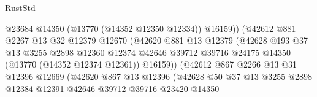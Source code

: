 \begin{lexlean}{RustStd}
\begin{coremodule}
                                        @23684
                                        @14350
                                        (@13770 (@14352 @12350 @12334))
                                        @16159))
                                    (@42612
                                      @881
                                      @2267
                                      @13
                                      @32
                                      @12379
                                      @12670
                                      (@42620
                                        @881
                                        @13
                                        @12379
                                        (@42628
                                          @193
                                          @37
                                          @13
                                          @3255
                                          @2898
                                          @12360
                                          @12374
                                          @42646
                                          @39712
                                          @39716
                                          @24175
                                          @14350
                                          (@13770 (@14352 @12374 @12361))
                                          @16159))
                                      (@42612
                                        @867
                                        @2266
                                        @13
                                        @31
                                        @12396
                                        @12669
                                        (@42620
                                          @867
                                          @13
                                          @12396
                                          (@42628
                                            @50
                                            @37
                                            @13
                                            @3255
                                            @2898
                                            @12384
                                            @12391
                                            @42646
                                            @39712
                                            @39716
                                            @23420
                                            @14350

\end{coremodule}
\end{lexlean}
